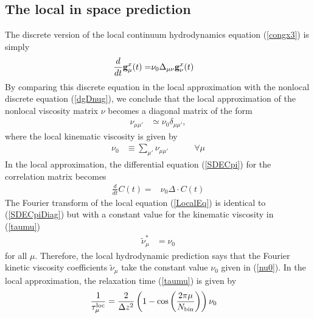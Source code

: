 \documentclass[b5paper,openright,10pt]{book}
\newcommand{\esc}{\!\cdot\!}
\begin{document}
\subsection{The local in space prediction}
The   discrete   version   of  the   local   continuum   hydrodynamics
equation (\ref{congx3}) is simply
\begin{align}
  \frac{d}{dt}{\bf g}^{x}_\mu(t)=&\nu_0\Delta_{\mu\nu}{\bf g}^{x}_\nu(t)
\label{gloc}
\end{align}
By comparing  this discrete equation  in the local  approximation with
the nonlocal  discrete equation  (\ref{dgDnug}), we conclude  that the
local approximation of the nonlocal viscosity matrix $\nu$ becomes a
diagonal matrix of the form
\begin{align}
\nu_{\mu\mu'}&\simeq \nu_0 \delta_{\mu\mu'},
\end{align}
where the local kinematic viscosity is given by
\begin{align}
\nu_0&\equiv \sum_{\mu'}\nu_{\mu\mu'} \quad \quad \quad\forall \mu
\label{nu0}
\end{align}
In the  local approximation, the differential  equation (\ref{SDECpi})
for the correlation matrix becomes
\begin{align}
  \frac{d}{dt}{C}(t)=&\nu_0{\Delta}\esc { C}(t)
  \label{LocalEq}
\end{align}
The Fourier transform of the local equation (\ref{LocalEq}) is identical to
(\ref{SDECpiDiag})  but  with  a  constant  value  for  the  kinematic
viscosity in (\ref{taumu})
\begin{align}
\tilde{\nu}^*_\mu&= \nu_0
\label{numunu0}
\end{align}
for all $\mu$. Therefore, the  local hydrodynamic prediction says that
the Fourier kinetic viscosity  coefficients $\tilde{\nu}_\mu$ take the
constant value $\nu_0$ given in (\ref{nu0}).
In the local approximation, the relaxation time (\ref{taumu}) is given by 
\begin{align}
 \frac{1}{\tau^{\rm loc}_\mu}&=\frac{2}{\Delta z^2}
\left(1-\cos\left( \frac{2\pi \mu}{N_{\rm bin}}\right)\right)
\nu_0
\label{taumuloc}
\end{align}



\end{document}
